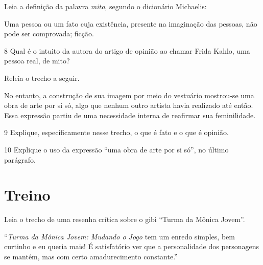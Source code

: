 
Leia a definição da palavra \emph{mito}, segundo o dicionário
Michaelis:

\begin{myquote}
Uma pessoa ou um fato cuja existência, presente na imaginação das
pessoas, não pode ser comprovada; ficção.
\end{myquote}

\num{8} Qual é o intuito da autora do artigo de opinião ao chamar Frida Kahlo,
uma pessoa real, de mito?


Releia o trecho a seguir. 

\begin{myquote}
No entanto, a construção de sua imagem por
meio do vestuário mostrou-se uma obra de arte por si só, algo que nenhum
outro artista havia realizado até então. Essa expressão partiu de uma
necessidade interna de reafirmar sua feminilidade.
\end{myquote}

\num{9} Explique, especificamente nesse trecho, o que é fato e o que é opinião.


\num{10} Explique o uso da expressão ``uma obra de arte por si só'', no
último parágrafo.


\section*{Treino}

Leia o trecho de uma resenha crítica sobre o gibi ``Turma da
Mônica Jovem''.

\begin{myquote}
``\emph{Turma da Mônica Jovem: Mudando o Jogo} tem um enredo simples,
bem curtinho e eu queria mais! É satisfatório ver que a personalidade
dos personagens se mantém, mas com certo amadurecimento constante.''

\end{myquote}

